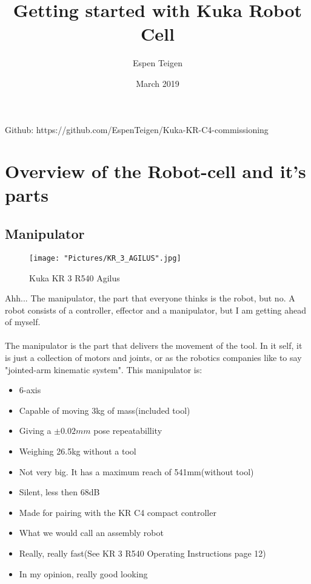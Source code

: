 \documentclass{article}
\title{Getting started with Kuka Robot Cell}
\author{Espen Teigen }
\date{March 2019}
\begin{document}
\maketitle

    Github: https://github.com/EspenTeigen/Kuka-KR-C4-commissioning

\newpage
\tableofcontents{}
\newpage


\section{Overview of the Robot-cell and it's parts}
    \subsection{Manipulator}
    
     \begin{figure}[!h]
        \centering
        \texttt{[image: "Pictures/KR\_3\_AGILUS".jpg]}
        \caption{Kuka KR 3 R540 Agilus}
    \end{figure}
    
    
    Ahh... The manipulator, the part that everyone thinks is the robot, but no. A robot consists of a controller, effector and a manipulator, but I am getting ahead of myself.
    \\\\
    The manipulator is the part that delivers the movement of the tool. In it self, it is just a collection of motors and joints, or as the robotics companies like to say "jointed-arm kinematic system". 
    \newpage
    This manipulator is:
    \begin{itemize}
        \item 6-axis
        \item Capable of moving 3kg of mass(included tool)
        \item Giving a $\pm 0.02mm$ pose repeatabillity
        \item Weighing 26.5kg without a tool
        \item Not very big. It has a maximum reach of 541mm(without tool)
        \item Silent, less then 68dB
        \item Made for pairing with the KR C4 compact controller
        \item What we would call an assembly robot
        \item Really, really fast(See KR 3 R540 Operating Instructions page 12)
        \item In my opinion, really good looking
    \end{itemize}
    
\end{document}
